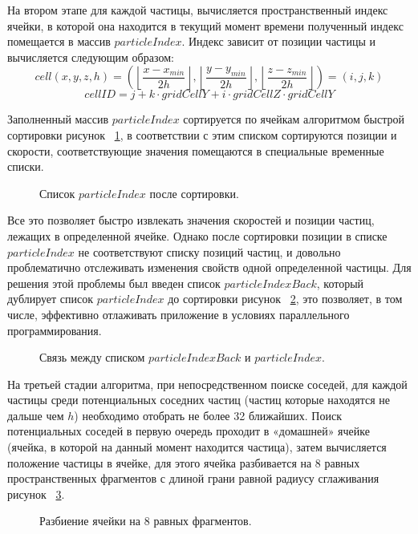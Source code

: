 На втором этапе для каждой частицы, вычисляется пространственный индекс ячейки, в которой она находится в текущий момент времени \cite {Teschner2003} полученный индекс помещается в массив \(particleIndex\).  Индекс зависит от позиции частицы и вычисляется следующим образом:
\[
  cell(x,y,z,h) = \left( \left \lfloor \frac{x - x_{min}}{2h} \right \rfloor, \left \lfloor \frac{y - y_{min}}{2h} \right \rfloor, \left \lfloor \frac{z - z_{min}}{2h} \right \rfloor \right ) = (i,j,k)
\]
\[
  cellID = j + k \cdot gridCellY + i \cdot gridCellZ \cdot gridCellY
\]

Заполненный массив \(particleIndex\) сортируется по ячейкам алгоритмом быстрой сортировки рисунок ~\ref{fig:ns_2}, в соответствии с этим списком сортируются позиции и скорости, соответствующие значения помещаются в специальные временные списки.
\begin{figure}[ht]
  \centerfloat{
    \texttt{[image: ns\_2]}
  }
  \caption{Список \(particleIndex\) после сортировки.}
  \label{fig:ns_2}
\end{figure}

Все это позволяет быстро извлекать значения скоростей и позиции частиц, лежащих в определенной ячейке. Однако после сортировки позиции в списке \(particleIndex\) не соответствуют списку позиций частиц, и довольно проблематично отслеживать изменения свойств одной определенной частицы. Для решения этой проблемы был введен список \(particleIndexBack\), который дублирует список \(particleIndex\) до сортировки рисунок ~\ref{fig:ns_3}, это позволяет, в том числе, эффективно отлаживать приложение в условиях параллельного программирования.
\begin{figure}[ht]
  \centerfloat{
    \texttt{[image: ns\_3]}
  }
  \caption{Связь между списком \(particleIndexBack\) и \(particleIndex\).}
  \label{fig:ns_3}
\end{figure}

На третьей стадии алгоритма, при непосредственном поиске соседей, для каждой частицы среди потенциальных соседних частиц (частиц которые находятся не дальше чем \(h\)) необходимо отобрать не более 32 ближайших. Поиск потенциальных соседей в первую очередь проходит в «домашней» ячейке (ячейка, в которой на данный момент находится частица), затем вычисляется положение частицы в ячейке, для этого ячейка разбивается на 8 равных пространственных фрагментов с длиной грани равной радиусу сглаживания рисунок ~\ref{fig:ns_4}.
\begin{figure}[ht]
  \centerfloat{
    \texttt{[image: ns\_4]}
  }
  \caption{Разбиение ячейки на 8 равных фрагментов.}
  \label{fig:ns_4}
\end{figure}

